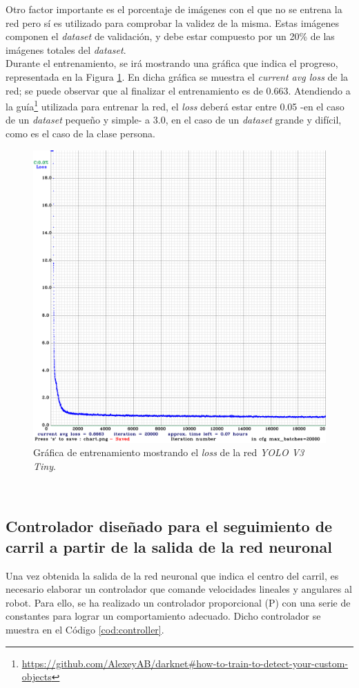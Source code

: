 Otro factor importante es el porcentaje de imágenes con el que no se entrena la red pero sí es utilizado para comprobar la validez de la misma. Estas imágenes componen el \textit{dataset} de validación, y debe estar compuesto por un 20\% de las imágenes totales del \textit{dataset}.\\

Durante el entrenamiento, se irá mostrando una gráfica que indica el progreso, representada en la Figura \ref{fig:chart}. En dicha gráfica se muestra el \textit{current avg loss} de la red; se puede observar que al finalizar el entrenamiento es de 0.663. Atendiendo a la guía\footnote{\url{https://github.com/AlexeyAB/darknet\#how-to-train-to-detect-your-custom-objects}} utilizada para entrenar la red, el \textit{loss} deberá estar entre 0.05 -en el caso de un \textit{dataset} pequeño y simple- a 3.0, en el caso de un \textit{dataset} grande y difícil, como es el caso de la clase persona.\\

\begin{figure} [h!]
	\begin{center}
		\includegraphics[width=12cm]{figs/chart}
	\end{center}
	\caption{Gráfica de entrenamiento mostrando el \textit{loss} de la red \textit{YOLO V3 Tiny}.}
	\label{fig:chart}
\end{figure}\

\subsection{Controlador diseñado para el seguimiento de carril a partir de la salida de la red neuronal}
Una vez obtenida la salida de la red neuronal que indica el centro del carril, es necesario elaborar un controlador que comande velocidades lineales y angulares al robot. Para ello, se ha realizado un controlador proporcional (P) con una serie de constantes para lograr un comportamiento adecuado. Dicho controlador se muestra en el Código \ref{cod:controller}.\\ 


